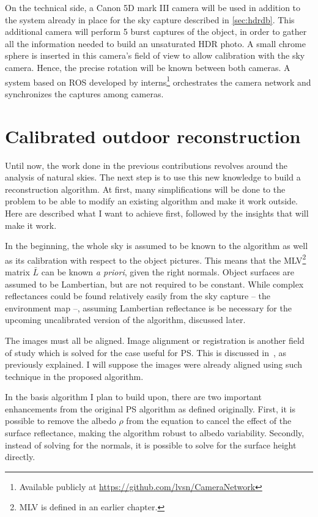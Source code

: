On the technical side, a Canon 5D mark III camera will be used in addition to the system already in place for the sky capture described in \ref{sec:hdrdb}. This additional camera will perform 5 burst captures of the object, in order to gather all the information needed to build an unsaturated HDR photo. A small chrome sphere is inserted in this camera's field of view to allow calibration with the sky camera. Hence, the precise rotation will be known between both cameras. A system based on ROS developed by interns\footnote{Available publicly at \url{https://github.com/lvsn/CameraNetwork}} orchestrates the camera network and synchronizes the captures among cameras.


\section{Calibrated outdoor reconstruction}
\label{sec:calib}

Until now, the work done in the previous contributions revolves around the analysis of natural skies. The next step is to use this new knowledge to build a reconstruction algorithm. At first, many simplifications will be done to the problem to be able to modify an existing algorithm and make it work outside. Here are described what I want to achieve first, followed by the insights that will make it work.

In the beginning, the whole sky is assumed to be known to the algorithm as well as its calibration with respect to the object pictures. This means that the MLV\footnote{MLV is defined in an earlier chapter.} matrix $\bar{L}$ can be known \emph{a priori}, given the right normals. Object surfaces are assumed to be Lambertian, but are not required to be constant. While complex reflectances could be found relatively easily from the sky capture -- the environment map --, assuming Lambertian reflectance is be necessary for the upcoming uncalibrated version of the algorithm, discussed later.

The images must all be aligned. Image alignment or registration is another field of study which is solved for the case useful for PS. This is discussed in~\cite{ackermann-cvpr-12}, as previously explained. I will suppose the images were already aligned using such technique in the proposed algorithm.

In the basis algorithm I plan to build upon, there are two important enhancements from the original PS algorithm as defined originally. First, it is possible to remove the albedo $\rho$ from the equation to cancel the effect of the surface reflectance, making the algorithm robust to albedo variability. Secondly, instead of solving for the normals, it is possible to solve for the surface height directly. 


